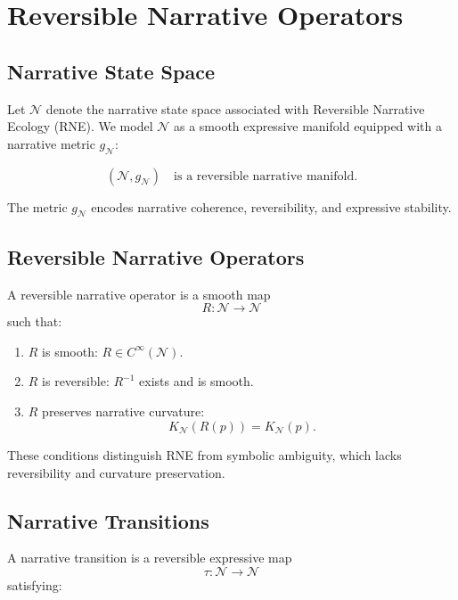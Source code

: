 
\section{Reversible Narrative Operators}
\label{sec:reversible-narrative-operators}

\subsection{Narrative State Space}

Let $\mathcal{N}$ denote the narrative state space associated with Reversible
Narrative Ecology (RNE). We model $\mathcal{N}$ as a smooth expressive manifold
equipped with a narrative metric $g_{\mathcal{N}}$:

\[
(\mathcal{N}, g_{\mathcal{N}}) \quad \text{is a reversible narrative manifold.}
\]

The metric $g_{\mathcal{N}}$ encodes narrative coherence, reversibility, and
expressive stability.

\subsection{Reversible Narrative Operators}

A reversible narrative operator is a smooth map
\[
R : \mathcal{N} \rightarrow \mathcal{N}
\]
such that:

\begin{enumerate}
    \item $R$ is smooth: $R \in C^\infty(\mathcal{N})$.
    \item $R$ is reversible: $R^{-1}$ exists and is smooth.
    \item $R$ preserves narrative curvature:
    \[
    K_{\mathcal{N}}(R(p)) = K_{\mathcal{N}}(p).
    \]
\end{enumerate}

These conditions distinguish RNE from symbolic ambiguity, which lacks
reversibility and curvature preservation.

\subsection{Narrative Transitions}

A narrative transition is a reversible expressive map
\[
\tau : \mathcal{N} \rightarrow \mathcal{N}
\]
satisfying:

